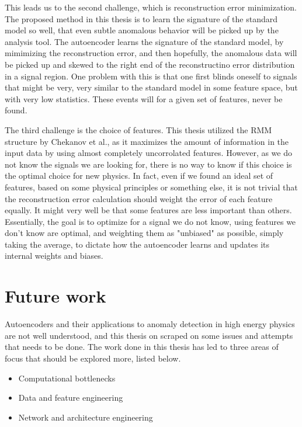 This leads us to the second challenge, which is reconstruction error minimization. The proposed method in this thesis is to 
learn the signature of the standard model so well, that even subtle anomalous behavior will be picked up by the analysis tool. 
The autoencoder learns the signature of the standard model, by mimimizing the reconstruction error, and then hopefully, the 
anomalous data will be picked up and skewed to the right end of the reconstructino error distribution in a signal region. 
One problem with this is that one first blinds oneself to signals that might be very, very similar to the standard model in some 
feature space, but with very low statistics. These events will for a given set of features, never be found. \par 

The third challenge is the choice of features. This thesis utilized the RMM structure by Chekanov et al., as it maximizes 
the amount of information in the input data by using almost completely uncorrolated features. However, as we do not know the signals 
we are looking for, there is no way to know if this choice is the optimal choice for new physics. In fact, even if we found 
an ideal set of features, based on some physical principles or something else, it is not trivial that the reconstruction error calculation
should weight the error of each feature equally. It might very well be that some features are less important than others. Essentially, 
the goal is to optimize for a signal we do not know, using features we don't know are optimal, and weighting them as "unbiased" as 
possible, simply taking the average, to dictate how the autoencoder learns and updates its internal weights and biases. 

\section{Future work}

Autoencoders and their applications to anomaly detection in high energy physics are not well understood, 
and this thesis on scraped on some issues and attempts that needs to be done. The work done in this 
thesis has led to three areas of focus that should be explored more, listed below. 

\begin{itemize}
    \item Computational bottlenecks 
    \item Data and feature engineering 
    \item Network and architecture engineering
\end{itemize}

